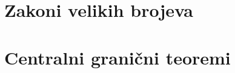 \documentclass[a4paper,twoside,12pt]{report}
\begin{document}
    


    


    


    \part{Zakoni velikih brojeva}   \label{dio:3}



    


    


    


    


    

    \part{Centralni grani\v cni teoremi}


    


    
\end{document}

